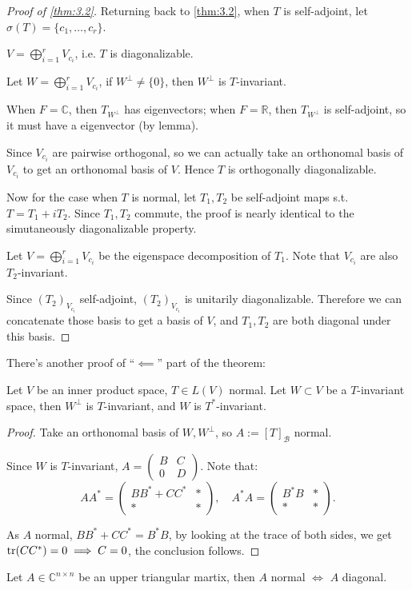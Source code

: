 \begin{proof}[Proof of \autoref{thm:3.2}]
	Returning back to \autoref{thm:3.2}, when $T$ is self-adjoint,
	let $\sigma(T) = \{c_1, \dots, c_r\}$.
	\begin{claim}
	    $V = \bigoplus_{i=1}^r V_{c_i}$, i.e. $T$ is diagonalizable.
	\end{claim}
	Let $W = \bigoplus_{i=1}^r V_{c_i}$, if $W^\perp \ne \{0\}$,
	then $W^\perp$ is $T$-invariant.

	When $F = \mathbb{C}$, then $T_{W^\perp}$ has eigenvectors;
	when $F = \mathbb{R}$, then $T_{W^\perp}$ is self-adjoint,
	so it must have a eigenvector (by lemma).
	\bigskip

	Since $V_{c_i}$ are pairwise orthogonal, so we can actually take an orthonomal
	basis of $V_{c_i}$ to get an orthonomal basis of $V$.
	Hence $T$ is orthogonally diagonalizable.

	Now for the case when $T$ is normal, let $T_1, T_2$ be self-adjoint maps s.t.
	$T = T_1 + iT_2$.
	Since $T_1, T_2$ commute, the proof is nearly identical to the simutaneously
	diagonalizable property.

	Let $V = \bigoplus_{i=1}^r V_{c_i}$ be the eigenspace decomposition of $T_1$.
	Note that $V_{c_i}$ are also $T_2$-invariant.

	Since $(T_2)_{V_{c_i}}$ self-adjoint, $(T_2)_{V_{c_i}}$ is
	unitarily diagonalizable.
	Therefore we can concatenate those basis to get a basis of $V$,
	and $T_1, T_2$ are both diagonal under this basis.
\end{proof}

There's another proof of ``$ \impliedby$'' part of the theorem:
\begin{proposition}
	Let $V$ be an inner product space, $T\in L(V)$ normal.
	Let $W \subset V$ be a $T$-invariant space, then $W^\perp$ is $T$-invariant,
	and $W$ is $T^*$-invariant.
\end{proposition}
\begin{proof}[Proof]
	Take an orthonomal basis of $W, W^\perp$, so $A:= [T]_{\mathcal{B}}$ normal.

	Since $W$ is $T$-invariant,
	$A = \begin{pmatrix}
		B & C\\ 0 & D
	\end{pmatrix}$. Note that:
	\[
	AA^* = \begin{pmatrix}
		BB^* + CC^* & * \\ * & *
	\end{pmatrix},\quad
	A^*A = \begin{pmatrix}
		B^*B &* \\ * &*
	\end{pmatrix}.
	\]

	As $A$ normal, $BB^*+CC^* = B^*B$, by looking at the trace of both sides,
	we get $\operatorname{tr}(CC^*) = 0\implies C = 0$, the conclusion follows.
\end{proof}
\begin{corollary}
    Let $A \in \mathbb{C}^{n\times n}$ be an upper triangular martix,
	then $A$ normal $\iff$ $A$ diagonal.
\end{corollary}

